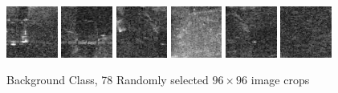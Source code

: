 \begin{figure}
    \includegraphics[width=0.15\textwidth]{chapters/images/dataset/all-class-images/background/non-match-bg61137-B.jpg}
    \includegraphics[width=0.15\textwidth]{chapters/images/dataset/all-class-images/background/non-match-bg58428-B.jpg}
    \includegraphics[width=0.15\textwidth]{chapters/images/dataset/all-class-images/background/non-match-bg43074-B.jpg}
    \includegraphics[width=0.15\textwidth]{chapters/images/dataset/all-class-images/background/non-match-bg44217-B.jpg}
    \includegraphics[width=0.15\textwidth]{chapters/images/dataset/all-class-images/background/non-match-bg44934-B.jpg}
    \includegraphics[width=0.15\textwidth]{chapters/images/dataset/all-class-images/background/non-match-bg66297-B.jpg}
    
    \caption{Background Class, 78 Randomly selected $96 \times 96$ image crops}
    \label{appendix:background}
\end{figure}
